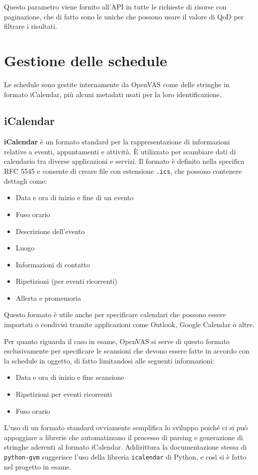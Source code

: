 Questo parametro viene fornito all'API in tutte le richieste di risorse con paginazione, che di fatto sono le uniche che possono usare il valore di QoD per filtrare i risultati.

\section{Gestione delle schedule}
Le schedule sono gestite internamente da OpenVAS come delle stringhe in formato iCalendar, più alcuni metadati usati per la loro identificazione.

\subsection{iCalendar}
\textbf{iCalendar} è un formato standard per la rappresentazione di informazioni relative a eventi, appuntamenti e attività. È utilizzato per scambiare dati di calendario tra diverse applicazioni e servizi. Il formato è definito nella specifica RFC 5545 \cite{rfc5545} e consente di creare file con estensione \texttt{.ics}, che possono contenere dettagli come:
\begin{itemize}
    \item Data e ora di inizio e fine di un evento
    \item Fuso orario
    \item Descrizione dell'evento
    \item Luogo
    \item Informazioni di contatto
    \item Ripetizioni (per eventi ricorrenti)
    \item Allerta e promemoria
\end{itemize}
Questo formato è utile anche per specificare calendari che possono essere importati o condivisi tramite applicazioni come Outlook, Google Calendar o altre.

Per quanto riguarda il caso in esame, OpenVAS si serve di questo formato esclusivamente per specificare le scansioni che devono essere fatte in accordo con la schedule in oggetto, di fatto limitandosi alle seguenti informazioni:
\begin{itemize}
    \item Data e ora di inizio e fine scansione
    \item Ripetizioni per eventi ricorrenti
    \item Fuso orario
\end{itemize}

L'uso di un formato standard ovviamente semplifica lo sviluppo poiché ci si può appoggiare a librerie che automatizzano il processo di parsing e generazione di stringhe aderenti al formato iCalendar. Addirittura la documentazione stessa di \texttt{python-gvm} suggerisce l'uso della libreria \texttt{icalendar} di Python, e così si è fatto nel progetto in esame.

